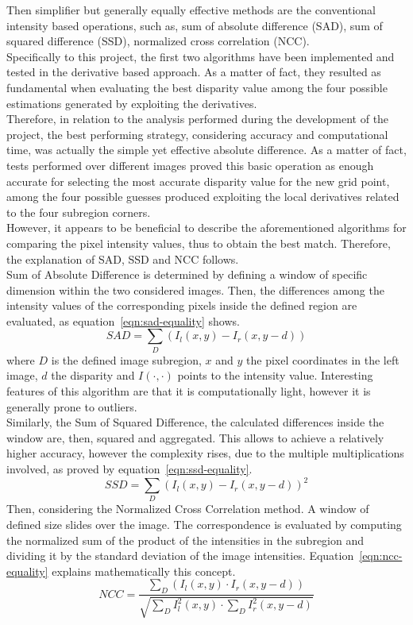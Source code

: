 Then simplifier but generally equally effective methods are the conventional intensity based operations, such as, sum of absolute difference (SAD), sum of squared difference (SSD), normalized cross correlation (NCC).\\
Specifically to this project, the first two algorithms have been implemented and tested in the derivative based approach.
As a matter of fact, they resulted as fundamental when evaluating the best disparity value among the four possible estimations generated by exploiting the derivatives.\\
Therefore, in relation to the analysis performed during the development of the project, the best performing strategy, considering accuracy and computational time, was actually the simple yet effective absolute difference.
As a matter of fact, tests performed over different images proved this basic operation as enough accurate for selecting the most accurate disparity value for the new grid point, among the four possible guesses produced exploiting the local derivatives related to the four subregion corners.\\
However, it appears to be beneficial to describe the aforementioned algorithms for comparing the pixel intensity values, thus to obtain the best match.
Therefore, the explanation of SAD, SSD and NCC follows.\\
Sum of Absolute Difference is determined by defining a window of specific dimension within the two considered images.
Then, the differences among the intensity values of the corresponding pixels inside the defined region are evaluated, as equation~\ref{eqn:sad-equality} shows.
\begin{equation}
	\label{eqn:sad-equality}
	SAD = \sum_{D} (I_l(x, y) - I_r(x, y - d))
\end{equation}
where $D$ is the defined image subregion, $x$ and $y$ the pixel coordinates in the left image, $d$ the disparity and $I(\cdot, \cdot)$ points to the intensity value.
Interesting features of this algorithm are that it is computationally light, however it is generally prone to outliers.\\
Similarly, the Sum of Squared Difference, the calculated differences inside the window are, then, squared and aggregated.
This allows to achieve a relatively higher accuracy, however the complexity rises, due to the multiple multiplications involved, as proved by equation~\ref{eqn:ssd-equality}.
\begin{equation}
	\label{eqn:ssd-equality}
	SSD = \sum_{D}(I_l(x, y) - I_r(x, y-d))^2
\end{equation}
Then, considering the Normalized Cross Correlation method.
A window of defined size slides over the image.
The correspondence is evaluated by computing the normalized sum of the product of the intensities in the subregion and dividing it by the standard deviation of the image intensities.
Equation~\ref{eqn:ncc-equality} explains mathematically this concept.
\begin{equation}
	\label{eqn:ncc-equality}
	NCC = \frac{\sum_D(I_l(x, y) \cdot I_r(x, y-d))}{\sqrt{\sum_D I_l^2(x, y) \cdot \sum_D I_r^2(x, y-d)}}
\end{equation}

